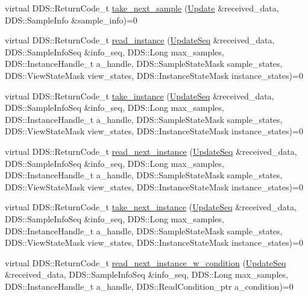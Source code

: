 \begin{DoxyCompactItemize}
virtual DDS::ReturnCode\_\-t \hyperlink{classKnowledge_1_1UpdateDataReader_ae03783b27b1c1cf0718e5f8b2921c1de}{take\_\-next\_\-sample} (\hyperlink{structKnowledge_1_1Update}{Update} \&received\_\-data, DDS::SampleInfo \&sample\_\-info)=0
\item 
virtual DDS::ReturnCode\_\-t \hyperlink{classKnowledge_1_1UpdateDataReader_a502069464da539d0e5997d4ba2641c23}{read\_\-instance} (\hyperlink{namespaceKnowledge_ab62e46316b954f0d249e0e45de7059dc}{UpdateSeq} \&received\_\-data, DDS::SampleInfoSeq \&info\_\-seq, DDS::Long max\_\-samples, DDS::InstanceHandle\_\-t a\_\-handle, DDS::SampleStateMask sample\_\-states, DDS::ViewStateMask view\_\-states, DDS::InstanceStateMask instance\_\-states)=0
\item 
virtual DDS::ReturnCode\_\-t \hyperlink{classKnowledge_1_1UpdateDataReader_ad7eba351fa1bd50038a3249f130636cd}{take\_\-instance} (\hyperlink{namespaceKnowledge_ab62e46316b954f0d249e0e45de7059dc}{UpdateSeq} \&received\_\-data, DDS::SampleInfoSeq \&info\_\-seq, DDS::Long max\_\-samples, DDS::InstanceHandle\_\-t a\_\-handle, DDS::SampleStateMask sample\_\-states, DDS::ViewStateMask view\_\-states, DDS::InstanceStateMask instance\_\-states)=0
\item 
virtual DDS::ReturnCode\_\-t \hyperlink{classKnowledge_1_1UpdateDataReader_a4cd59dd5dc9dc0aed118bac446ffaf8f}{read\_\-next\_\-instance} (\hyperlink{namespaceKnowledge_ab62e46316b954f0d249e0e45de7059dc}{UpdateSeq} \&received\_\-data, DDS::SampleInfoSeq \&info\_\-seq, DDS::Long max\_\-samples, DDS::InstanceHandle\_\-t a\_\-handle, DDS::SampleStateMask sample\_\-states, DDS::ViewStateMask view\_\-states, DDS::InstanceStateMask instance\_\-states)=0
\item 
virtual DDS::ReturnCode\_\-t \hyperlink{classKnowledge_1_1UpdateDataReader_aea925f946609743a2eea698d5de6720f}{take\_\-next\_\-instance} (\hyperlink{namespaceKnowledge_ab62e46316b954f0d249e0e45de7059dc}{UpdateSeq} \&received\_\-data, DDS::SampleInfoSeq \&info\_\-seq, DDS::Long max\_\-samples, DDS::InstanceHandle\_\-t a\_\-handle, DDS::SampleStateMask sample\_\-states, DDS::ViewStateMask view\_\-states, DDS::InstanceStateMask instance\_\-states)=0
\item 
virtual DDS::ReturnCode\_\-t \hyperlink{classKnowledge_1_1UpdateDataReader_adee304d2b374df5401b5c60fef44301b}{read\_\-next\_\-instance\_\-w\_\-condition} (\hyperlink{namespaceKnowledge_ab62e46316b954f0d249e0e45de7059dc}{UpdateSeq} \&received\_\-data, DDS::SampleInfoSeq \&info\_\-seq, DDS::Long max\_\-samples, DDS::InstanceHandle\_\-t a\_\-handle, DDS::ReadCondition\_\-ptr a\_\-condition)=0

\end{DoxyCompactItemize}
